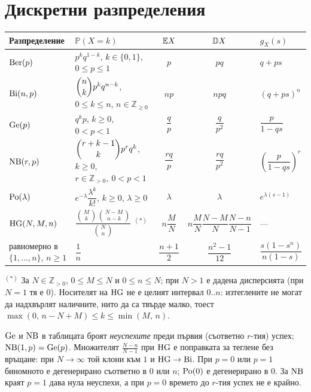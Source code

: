 \section{Дискретни разпределения}

\begin{center}
\footnotesize
\setlength{\tabcolsep}{4pt}
\begin{tabular}{@{}llccl@{}}
\toprule
\textbf{Разпределение} & $\mathbb{P}(X=k)$ & $\mathbb{E} X$ & $\mathbb{D} X$ & $g_X(s)$ \\
\midrule
$\operatorname{Ber}(p)$ & $p^k q^{1-k}$, $k \in \{0,1\}$, $0\le p\le1$ & $p$ & $pq$ & $q+ps$ \\[3pt]
$\operatorname{Bi}(n,p)$ & $\dbinom{n}{k} p^k q^{n-k}$, $0 \le k \le n$, $n\in\mathbb Z_{\ge0}$ & $np$ & $npq$ & $(q+ps)^n$ \\[5pt]
$\operatorname{Ge}(p)$ & $q^k p$, $k \ge 0$, $0<p<1$ & $\dfrac{q}{p}$ & $\dfrac{q}{p^2}$ & $\dfrac{p}{1-qs}$ \\[7pt]
$\operatorname{NB}(r,p)$ & $\dbinom{r+k-1}{k} p^r q^k$, $k \ge 0$, $r\in\mathbb Z_{>0},\ 0<p<1$ & $\dfrac{rq}{p}$ & $\dfrac{rq}{p^2}$ & $\left(\dfrac{p}{1-qs}\right)^{\! r}$ \\[7pt]
$\operatorname{Po}(\lambda)$ & $e^{-\lambda}\dfrac{\lambda^k}{k!}$, $k \ge 0$, $\lambda\ge0$ & $\lambda$ & $\lambda$ & $e^{\lambda(s-1)}$ \\[7pt]
$\operatorname{HG}(N,M,n)$ & $\dfrac{\binom{M}{k}\binom{N-M}{n-k}}{\binom{N}{n}}$ ${}^{(*)}$ & $n\dfrac{M}{N}$ & $n\dfrac{M}{N}\dfrac{N-M}{N}\dfrac{N-n}{N-1}$ & --- \\[7pt]
равномерно в $\{1,\dots,n\}$, $n\ge1$ & $\dfrac{1}{n}$ & $\dfrac{n+1}{2}$ & $\dfrac{n^2-1}{12}$ & $\dfrac{s(1-s^n)}{n(1-s)}$ \\
\bottomrule
\end{tabular}
\end{center}

\noindent
${}^{(*)}$ За $N\in\mathbb Z_{>0}$, $0\le M\le N$ и $0\le n\le N$; при $N>1$
е дадена дисперсията (при $N=1$ тя е $0$). Носителят на $\operatorname{HG}$ не е целият интервал $0..n$: изтеглените не могат да
надхвърлят наличните, нито да са твърде малко, тоест
$\max(0,\, n-N+M) \le k \le \min(M,\, n)$.

\noindent
$\operatorname{Ge}$ и $\operatorname{NB}$ в таблицата броят \emph{неуспехите} преди първия (съответно $r$-тия)
успех; $\operatorname{NB}(1,p) = \operatorname{Ge}(p)$. Множителят $\frac{N-n}{N-1}$ при $\operatorname{HG}$ е поправката за
теглене без връщане: при $N \to \infty$ той клони към $1$ и $\operatorname{HG} \to \operatorname{Bi}$.
При $p=0$ или $p=1$ биномното е дегенерирано съответно в $0$ или $n$;
$\operatorname{Po}(0)$ е дегенерирано в $0$. За $\operatorname{NB}$ краят $p=1$ дава нула
неуспехи, а при $p=0$ времето до $r$-тия успех не е крайно.

